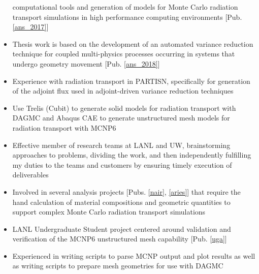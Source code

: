 \begin{center}
\begin{minipage}{\textwidth}
\begin{itemize}[leftmargin=.875in,rightmargin=.875in,itemsep=1.0mm]
		       computational tools
		       and generation of models for Monte Carlo radiation transport
		       simulations
		       in high performance computing environments [Pub. \ref{ans_2017}]
	       \item Thesis work is based on the development of an automated variance reduction technique for
		       coupled multi-physics processes occurring in 
		       systems that undergo geometry movement [Pub. \ref{ans_2018}]
              \item Experience with radiation transport in PARTISN, specifically for                    generation of the adjoint flux used in adjoint-driven variance reduction techniques
              \item Use Trelis (Cubit) to generate solid models for radiation transport with DAGMC and Abaqus CAE to generate unstructured mesh models for radiation transport with MCNP6
		\item Effective member of research teams at LANL and
			UW, brainstorming approaches to problems, dividing the
			work, and then independently fulfilling my duties to the teams and
			customers by ensuring timely execution of deliverables
	       \item Involved in several analysis projects
		      [Pubs. \ref{nair}, \ref{aries}]	       
			       that require the hand calculation of material compositions
			     and geometric quantities to support complex Monte
			      Carlo radiation transport simulations
	       \item  LANL Undergraduate Student project centered around validation and
		       verification of the MCNP6 unstructured mesh
		       capability [Pub. \ref{uga}]
	       \item Experienced in writing scripts to parse MCNP output
	               and plot results as well as writing scripts to
		       prepare mesh geometries for use with DAGMC

\end{itemize}
\end{minipage}
\end{center}
